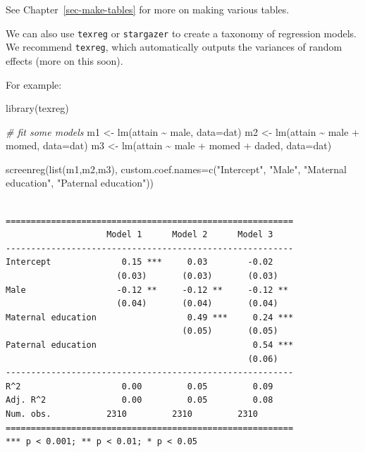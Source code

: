 \documentclass[
  letterpaper,
  DIV=11,
  numbers=noendperiod]{scrreprt}
\newenvironment{Shaded}{\begin{snugshade}}{\end{snugshade}}
\newcommand{\AttributeTok}[1]{\textcolor[rgb]{0.49,0.56,0.16}{#1}}
\newcommand{\CommentTok}[1]{\textcolor[rgb]{0.38,0.63,0.69}{\textit{#1}}}
\newcommand{\FunctionTok}[1]{\textcolor[rgb]{0.02,0.16,0.49}{#1}}
\newcommand{\NormalTok}[1]{\textcolor[rgb]{0.00,0.44,0.13}{#1}}
\newcommand{\OtherTok}[1]{\textcolor[rgb]{0.00,0.44,0.13}{#1}}
\newcommand{\SpecialCharTok}[1]{\textcolor[rgb]{0.25,0.44,0.63}{#1}}
\newcommand{\StringTok}[1]{\textcolor[rgb]{0.25,0.44,0.63}{#1}}
\begin{document}
See Chapter~\ref{sec-make-tables} for more on making various tables.

We can also use \texttt{texreg} or \texttt{stargazer} to create a
taxonomy of regression models. We recommend \texttt{texreg}, which
automatically outputs the variances of random effects (more on this
soon).

For example:

\begin{Shaded}
\begin{Highlighting}[]
\FunctionTok{library}\NormalTok{(texreg)}

\CommentTok{\# fit some models }
\NormalTok{m1 }\OtherTok{\textless{}{-}} \FunctionTok{lm}\NormalTok{(attain }\SpecialCharTok{\textasciitilde{}}\NormalTok{ male, }\AttributeTok{data=}\NormalTok{dat)}
\NormalTok{m2 }\OtherTok{\textless{}{-}} \FunctionTok{lm}\NormalTok{(attain }\SpecialCharTok{\textasciitilde{}}\NormalTok{ male }\SpecialCharTok{+}\NormalTok{ momed, }\AttributeTok{data=}\NormalTok{dat)}
\NormalTok{m3 }\OtherTok{\textless{}{-}} \FunctionTok{lm}\NormalTok{(attain }\SpecialCharTok{\textasciitilde{}}\NormalTok{ male }\SpecialCharTok{+}\NormalTok{ momed }\SpecialCharTok{+}\NormalTok{ daded, }\AttributeTok{data=}\NormalTok{dat)}

\FunctionTok{screenreg}\NormalTok{(}\FunctionTok{list}\NormalTok{(m1,m2,m3), }
          \AttributeTok{custom.coef.names=}\FunctionTok{c}\NormalTok{(}\StringTok{"Intercept"}\NormalTok{, }\StringTok{"Male"}\NormalTok{, }\StringTok{"Maternal education"}\NormalTok{, }\StringTok{"Paternal education"}\NormalTok{))}
\end{Highlighting}
\end{Shaded}

\begin{verbatim}

=========================================================
                    Model 1      Model 2      Model 3    
---------------------------------------------------------
Intercept              0.15 ***     0.03        -0.02    
                      (0.03)       (0.03)       (0.03)   
Male                  -0.12 **     -0.12 **     -0.12 ** 
                      (0.04)       (0.04)       (0.04)   
Maternal education                  0.49 ***     0.24 ***
                                   (0.05)       (0.05)   
Paternal education                               0.54 ***
                                                (0.06)   
---------------------------------------------------------
R^2                    0.00         0.05         0.09    
Adj. R^2               0.00         0.05         0.08    
Num. obs.           2310         2310         2310       
=========================================================
*** p < 0.001; ** p < 0.01; * p < 0.05
\end{verbatim}
\end{document}
